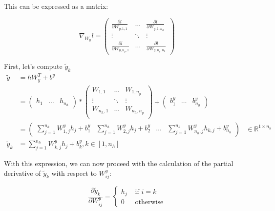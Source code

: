 This can be expressed as a matrix:

\[
    \nabla_{W_y} l = \begin{pmatrix}
        \frac{\partial l}{\partial W_{y, 1,1}}   & \dots  & \frac{\partial l}{\partial W_{y, 1,n_h}}    \\
        \vdots                                   & \ddots & \vdots                                      \\
        \frac{\partial l}{\partial W_{y, n_y,1}} & \dots  & \frac{\partial l}{\partial W_{y, n_y, n_h}}
    \end{pmatrix}
\]

First, let's compute $ \tilde{y}_k $
\begin{align*}
    \tilde{y}   & = h W_y^T + b^y                                                                                                        \\
                & = \begin{pmatrix}
        h_{1} & \dots & h_{n_h}
    \end{pmatrix} * \begin{pmatrix}
        W_{1, 1}   & \dots  & W_{1, n_y}   \\
        \vdots     & \ddots & \vdots       \\
        W_{n_h, 1} & \dots  & W_{n_h, n_y} \\
    \end{pmatrix} + \begin{pmatrix}
        b^y_1 & \dots & b^y_{n_y}
    \end{pmatrix}                                 \\
                & = \begin{pmatrix}
        \sum_{j=1}^{n_h} W^y_{1,j} h_{j} + b^y_1 & \sum_{j=1}^{n_h} W^y_{2,j} h_{j} + b^y_2 & \dots & \sum_{j=1}^{n_h} W^y_{n_h,j} h_{k,j} + b^y_{n_h}
    \end{pmatrix}                                                           & \in \mathbb{R}^{1 \times n_h} \\
    \tilde{y}_k & = \sum_{j=1}^{n_h} W^y_{k,j} h_{j} + b_k^y, k \in [1, n_h]
\end{align*}

With this expression, we can now proceed with the calculation of the partial derivative of \( \tilde{y}_k \) with respect to \( W^y_{ij} \):

\[
    \frac{\partial \tilde{y}_k }{\partial W^y_{ij}} = \begin{cases}
        h_j & \text{ if } i=k   \\
        0   & \text{ otherwise}
    \end{cases}
\]

